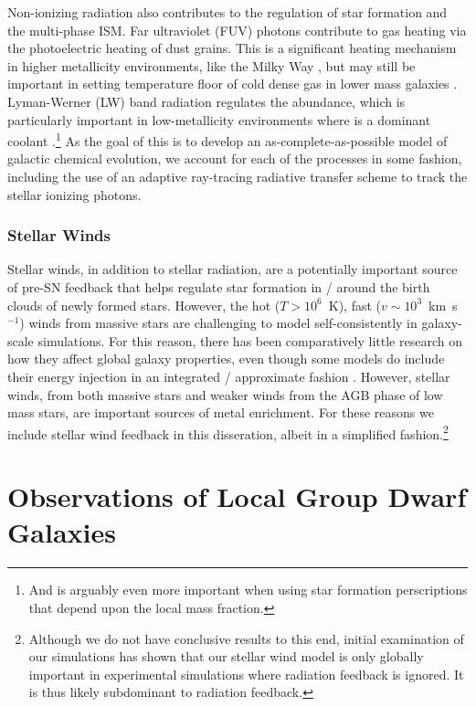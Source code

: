 Non-ionizing radiation also contributes to the regulation of star formation and the multi-phase ISM. Far ultraviolet (FUV) photons contribute to gas heating via the photoelectric heating of dust grains. This is a significant heating mechanism in higher metallicity environments, like the Milky Way \citep{Parravano2003,Wolfire2003}, but may still be important in setting temperature floor of cold dense gas in lower mass galaxies \citep{Forbes2016,Hu2017}. Lyman-Werner (LW) band radiation regulates the \Hmolecular abundance, which is particularly important in low-metallicity environments where \Hmolecular is a dominant coolant \citep[e.g.][]{Glover2003,Wolcott-Green2012}.\footnote{And is arguably even more important when using star formation perscriptions that depend upon the local \Hmolecular mass fraction.} As the goal of this \dissertation is to develop an as-complete-as-possible model of galactic chemical evolution, we account for each of the processes in some fashion, including the use of an adaptive ray-tracing radiative transfer scheme to track the stellar ionizing photons.

\subsubsection{Stellar Winds}
\label{intro:sec:stellarwinds}

Stellar winds, in addition to stellar radiation, are a potentially important source of pre-SN feedback that helps regulate star formation in / around the birth clouds of newly formed stars. However, the hot ($T>10^{6}$~K), fast ($v \sim 10^{3}$~km~s$^{-1}$) winds from massive stars \citep{Weaver1977} are challenging to model self-consistently in galaxy-scale simulations. For this reason, there has been comparatively little research on how they affect global galaxy properties, even though some models do include their energy injection in an integrated / approximate fashion \citep[e.g.][]{FIRE}. However, stellar winds, from both massive stars and weaker winds from the AGB phase of low mass stars, are important sources of metal enrichment. For these reasons we include stellar wind feedback in this disseration, albeit in a simplified fashion.\footnote{Although we do not have conclusive results to this end, initial examination of our simulations has shown that our stellar wind model is only globally important in experimental simulations where radiation feedback is ignored. It is thus likely subdominant to radiation feedback.}

\section{Observations of Local Group Dwarf Galaxies}
\label{intro:sec:LG dwarfs}

